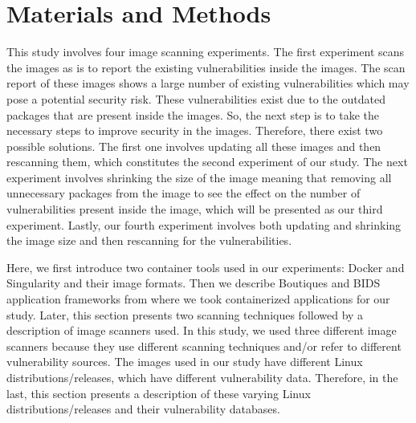 \documentclass[a4paper,num-refs]{oup-contemporary}
\begin{document}
\section{Materials and Methods}

This study involves four image scanning experiments.
The first experiment scans the images as is to report the existing vulnerabilities
inside the images. The scan report of
these images shows a large number of existing vulnerabilities which may pose
a potential security risk. These vulnerabilities exist due to the outdated
packages that are present inside the images. So, the next step is to
take the necessary steps to improve security in the images. Therefore, there exist
two possible solutions.
The first one involves updating
all these images and then rescanning them, which constitutes the second experiment of our study. The next 
experiment involves shrinking the size of the image
meaning that removing all unnecessary packages from the image to see the effect on the number of
vulnerabilities present inside the image, which will be presented as our third experiment.
Lastly, our fourth experiment involves both updating and shrinking the image size and then
rescanning for the vulnerabilities.

Here, we first
introduce two container tools used in our experiments: Docker and
Singularity and their image formats. Then we describe Boutiques and BIDS application frameworks
from where we took containerized applications for our study. 
Later, this section
presents two scanning techniques followed by a description of image scanners used.
In this study, we used three different image scanners because they
use different scanning techniques and/or refer to different vulnerability sources.
The images used in our study have different Linux distributions/releases, which have
different vulnerability data. Therefore, in the last, this section presents a
description of these varying Linux distributions/releases and their
vulnerability databases.


\end{document}
